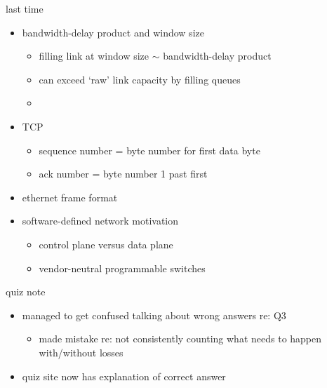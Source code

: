 \date{}
\title{}
\date{}

\begin{frame}
    \titlepage
\end{frame}

\begin{frame}{last time}
    \begin{itemize}
    \item bandwidth-delay product and window size
        \begin{itemize}
        \item filling link at window size $\sim$ bandwidth-delay product
        \item can exceed `raw' link capacity by filling queues
        \item {}
        \end{itemize}
    \item TCP
        \begin{itemize}
        \item sequence number = byte number for first data byte
        \item ack number = byte number 1 past first
        \end{itemize}
    \item ethernet frame format
    \item software-defined network motivation
        \begin{itemize}
        \item control plane versus data plane
        \item vendor-neutral programmable switches
        \end{itemize}
    \end{itemize}
\end{frame}

\begin{frame}{quiz note}
    \begin{itemize}
    \item managed to get confused talking about wrong answers re: Q3
        \begin{itemize}
        \item made mistake re: not consistently counting what needs to happen with/without losses
        \end{itemize}
    \item quiz site now has explanation of correct answer
    \end{itemize}
\end{frame}

